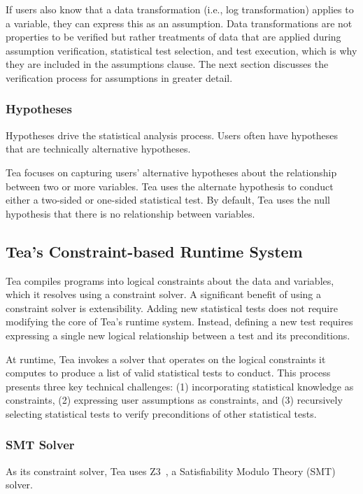 If users also know that a data transformation (i.e., log transformation) applies
to a variable, they can express this as an assumption. Data transformations are
not properties to be verified but rather treatments of data that are applied
during assumption verification, statistical test selection, and test execution,
which is why they are included in the assumptions clause. The next section discusses the
verification process for assumptions in greater detail.

\figureModes

\subsubsection{Hypotheses}
Hypotheses drive the statistical analysis process. Users often have
hypotheses that are technically alternative hypotheses.

Tea focuses on capturing users' alternative hypotheses about the
relationship between two or more variables. Tea uses the alternate
hypothesis to conduct either a two-sided or one-sided statistical
test. By default, Tea uses the null hypothesis that there is no
relationship between variables.



\subsection{Tea's Constraint-based Runtime System} \label{sec:TeaRS}
Tea compiles programs into logical constraints about the data and
variables, which it resolves using a constraint solver. A significant
benefit of using a constraint solver is extensibility. Adding new
statistical tests does not require modifying the core of Tea's runtime
system. Instead, defining a new test requires expressing a single new
logical relationship between a test and its preconditions.

At runtime, Tea invokes a solver that operates on the logical
constraints it computes to produce a list of valid statistical tests
to conduct. This process presents three key technical challenges: (1)
incorporating statistical knowledge as constraints, (2) expressing
user assumptions as constraints, and (3) recursively selecting
statistical tests to verify preconditions of other statistical tests.

\subsubsection{SMT Solver}
As its constraint solver, Tea uses Z3~\cite{de2008z3}, a Satisfiability Modulo Theory (SMT) solver.

